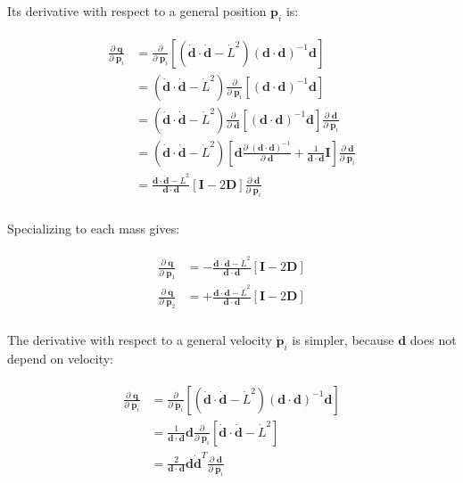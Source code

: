 \documentclass[]{article}
\newcommand{\pd}[2]{\frac{\partial\;#1}{\partial\;#2}}
\newcommand{\pddown}[2]{\frac{\partial}{\partial\;#2} \left[ #1 \right] }
\begin{document}
Its derivative with respect to a general position $\mathbf{p}_i$ is:

\begin{align}
\begin{split}
    \pd{\mathbf{q}}{\mathbf{p}_i}
    &= \pddown{(\dot{\mathbf{d}} \cdot \dot{\mathbf{d}} - \dot{L}^2) (\mathbf{d} \cdot \mathbf{d})^{-1} \mathbf{d}}{\mathbf{p}_i} \\
    &= (\dot{\mathbf{d}} \cdot \dot{\mathbf{d}} - \dot{L}^2) \pddown{(\mathbf{d} \cdot \mathbf{d})^{-1} \mathbf{d}}{\mathbf{p}_i} \\
    &= (\dot{\mathbf{d}} \cdot \dot{\mathbf{d}} - \dot{L}^2) \pddown{(\mathbf{d} \cdot \mathbf{d})^{-1} \mathbf{d}}{\mathbf{d}} \pd{\mathbf{d}}{\mathbf{p}_i} \\
    &= (\dot{\mathbf{d}} \cdot \dot{\mathbf{d}} - \dot{L}^2) \left[ \mathbf{d} \pd{(\mathbf{d} \cdot \mathbf{d})^{-1}}{\mathbf{d}} + \frac{1}{\mathbf{d} \cdot \mathbf{d}} \mathbf{I} \right] \pd{\mathbf{d}}{\mathbf{p}_i} \\
    &= \frac{\dot{\mathbf{d}} \cdot \dot{\mathbf{d}} - \dot{L}^2}{\mathbf{d} \cdot \mathbf{d}} \left[ \mathbf{I} - 2\mathbf{D} \right] \pd{\mathbf{d}}{\mathbf{p}_i} \\
\end{split}
\end{align}

Specializing to each mass gives:

\begin{align}
\begin{split}
    \pd{\mathbf{q}}{\mathbf{p}_1} &= -\frac{\dot{\mathbf{d}} \cdot \dot{\mathbf{d}} - \dot{L}^2}{\mathbf{d} \cdot \mathbf{d}} \left[ \mathbf{I} - 2\mathbf{D} \right] \\
    \pd{\mathbf{q}}{\mathbf{p}_2} &= +\frac{\dot{\mathbf{d}} \cdot \dot{\mathbf{d}} - \dot{L}^2}{\mathbf{d} \cdot \mathbf{d}} \left[ \mathbf{I} - 2\mathbf{D} \right] \\
\end{split}
\end{align}

The derivative with respect to a general velocity $\dot{\mathbf{p}}_i$ is simpler, because $\mathbf{d}$ does not depend on velocity:

\begin{align}
\begin{split}
    \pd{\mathbf{q}}{\dot{\mathbf{p}}_i}
    &= \pddown{(\dot{\mathbf{d}} \cdot \dot{\mathbf{d}} - \dot{L}^2) (\mathbf{d} \cdot \mathbf{d})^{-1} \mathbf{d}}{\dot{\mathbf{p}}_i} \\
    &= \frac{1}{\mathbf{d} \cdot \mathbf{d}} \mathbf{d} \pddown{\dot{\mathbf{d}} \cdot \dot{\mathbf{d}} - \dot{L}^2}{\dot{\mathbf{p}}_i} \\
    &= \frac{2}{\mathbf{d} \cdot \mathbf{d}} \mathbf{d} \dot{\mathbf{d}}^T \pd{\dot{\mathbf{d}}}{\dot{\mathbf{p}}_i} \\
\end{split}
\end{align}
\end{document}
